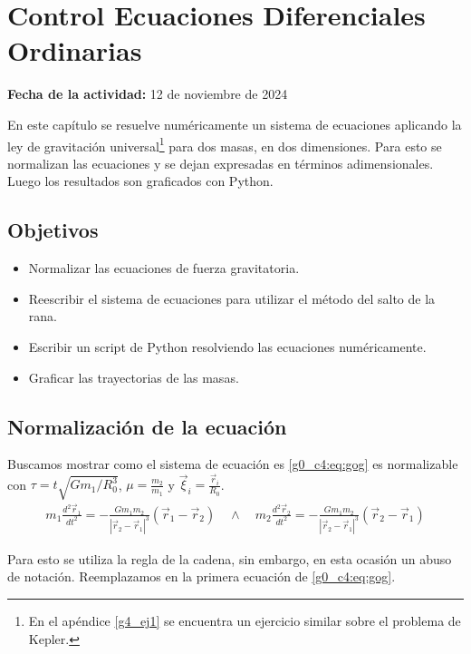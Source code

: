 \documentclass[../portafolio.tex]{subfiles}
\begin{document}
\chapter{Control Ecuaciones Diferenciales Ordinarias}
\label{g0_c4}
\hfill \textbf{Fecha de la actividad:} 12 de noviembre de 2024

\medskip

En este capítulo se resuelve numéricamente un sistema de ecuaciones aplicando la ley de gravitación universal\footnote{En el apéndice \ref{g4_ej1} se encuentra un ejercicio similar sobre el problema de Kepler.} para dos masas, en dos dimensiones. Para esto se normalizan las ecuaciones y se dejan expresadas en términos adimensionales. Luego los resultados son graficados con Python.

\section*{Objetivos}
\begin{itemize}
\item Normalizar las ecuaciones de fuerza gravitatoria.
\item Reescribir el sistema de ecuaciones para utilizar el método del salto de la rana.
\item Escribir un script de Python resolviendo las ecuaciones numéricamente.
\item Graficar las trayectorias de las masas.
\end{itemize}

\section{Normalización de la ecuación}
Buscamos mostrar como el sistema de ecuación es \eqref{g0_c4:eq:gog} es normalizable con $\tau=t\sqrt{Gm_1/R_0^3}$, $\mu=\frac{m_2}{m_1}$ y $\vec{\xi}_i=\frac{\vec{r}_i}{R_0}$.
\begin{align} \label{g0_c4:eq:gog}
m_1 \frac{d^2 \vec{r}_1}{dt^2} = - \frac{G m_1 m_2 }{|\vec{r}_2 - \vec{r}_1|^3}(\vec{r}_1 - \vec{r}_2) \quad \wedge \quad
m_2 \frac{d^2 \vec{r}_2}{dt^2} = - \frac{G m_1 m_2 }{|\vec{r}_2 - \vec{r}_1|^3}(\vec{r}_2 - \vec{r}_1)
 \end{align}

Para esto se utiliza la regla de la cadena, sin embargo, en esta ocasión un abuso de notación. Reemplazamos en la primera ecuación de \eqref{g0_c4:eq:gog}.
\end{document}
